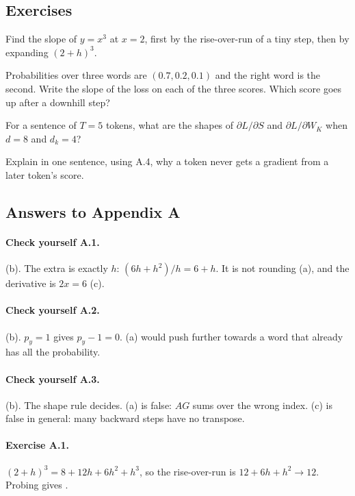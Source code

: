 \subsection*{Exercises}
\begin{exercise}
Find the slope of $y=x^3$ at $x=2$, first by the rise-over-run of a tiny step, then by expanding $(2+h)^3$.
\end{exercise}
\begin{exercise}
Probabilities over three words are $(0.7, 0.2, 0.1)$ and the right word is the second. Write the slope of
the loss on each of the three scores. Which score goes up after a downhill step?
\end{exercise}
\begin{exercise}
For a sentence of $T=5$ tokens, what are the shapes of $\partial L/\partial S$ and $\partial L/\partial W_K$
when $d=8$ and $d_k=4$?
\end{exercise}
\begin{exercise}
Explain in one sentence, using A.4, why a token never gets a gradient from a later token's score.
\end{exercise}

\subsection*{Answers to Appendix A}

\paragraph{Check yourself A.1.} (b). The extra is exactly $h$: $(6h+h^2)/h=6+h$. It is not rounding (a), and
the derivative is $2x=6$ (c).
\paragraph{Check yourself A.2.} (b). $p_y=1$ gives $p_y-1=0$. (a) would push further towards a word that
already has all the probability.
\paragraph{Check yourself A.3.} (b). The shape rule decides. (a) is false: $AG$ sums over the wrong index.
(c) is false in general: many backward steps have no transpose.

\paragraph{Exercise A.1.} $(2+h)^3 = 8+12h+6h^2+h^3$, so the rise-over-run is $12+6h+h^2\to12$. Probing
gives \nAppAExCube.

